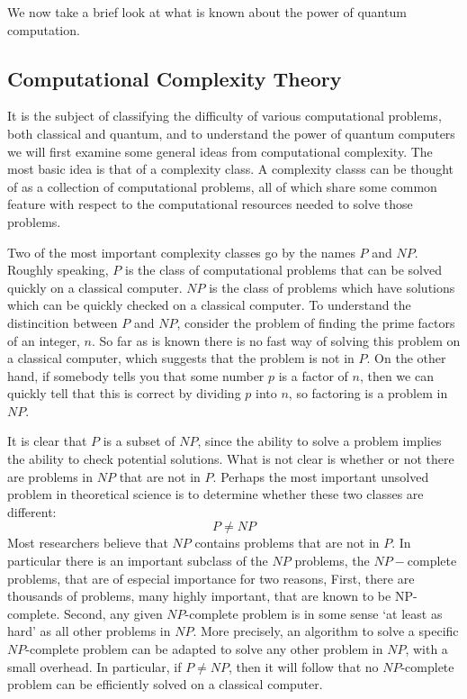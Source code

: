 \documentclass[12pt, oneside]{book}
\theoremstyle{definition}
\theoremstyle{definition}
\theoremstyle{remark}
\begin{document}
We now take a brief look at what is known about the power of quantum computation.

\subsection{Computational Complexity Theory}
It is the subject of classifying the difficulty of various computational problems, both classical and quantum, and to understand the power of quantum computers we will first examine some general ideas from computational complexity. The most basic idea is that of a complexity class. A complexity classs can be thought of as a collection of computational problems, all of which share some common feature with respect to the computational resources needed to solve those problems.

Two of the most important complexity classes go by the names $P$ and $NP$. Roughly speaking, $P$ is the class of computational problems that can be solved quickly on a classical computer. $NP$ is the class of problems which have solutions which can be quickly checked on a classical computer. To understand the distincition between $P$ and $NP$, consider the problem of finding the prime factors of an integer, $n$. So far as is known there is no fast way of solving this problem on a classical computer, which suggests that the problem is not in $P$. On the other hand, if somebody tells you that some number $p$ is a factor of $n$, then we can quickly tell that this is correct by dividing $p$ into $n$, so factoring is a problem in $NP$.

It is clear that $P$ is a subset of $NP$, since the ability to solve a problem implies the ability to check potential solutions. What is not clear is whether or not there are problems in $NP$ that are not in $P$. Perhaps the most important unsolved problem in theoretical science is to determine whether these two classes are different:
\[
P\neq NP
\]
Most researchers believe that $NP$ contains problems that are not in $P$. In particular there is an important subclass of the $NP$ problems, the $NP-$complete problems, that are of especial importance for two reasons, First, there are thousands of problems, many highly important, that are known to be NP-complete. Second, any given $NP$-complete problem is in some sense `at least as hard' as all other problems in $NP$. More precisely, an algorithm to solve a specific $NP$-complete problem can be adapted to solve any other problem in $NP$, with a small overhead. In particular, if $P \neq NP$, then it will follow that no $NP$-complete problem can be efficiently solved on a classical computer.
\end{document}
